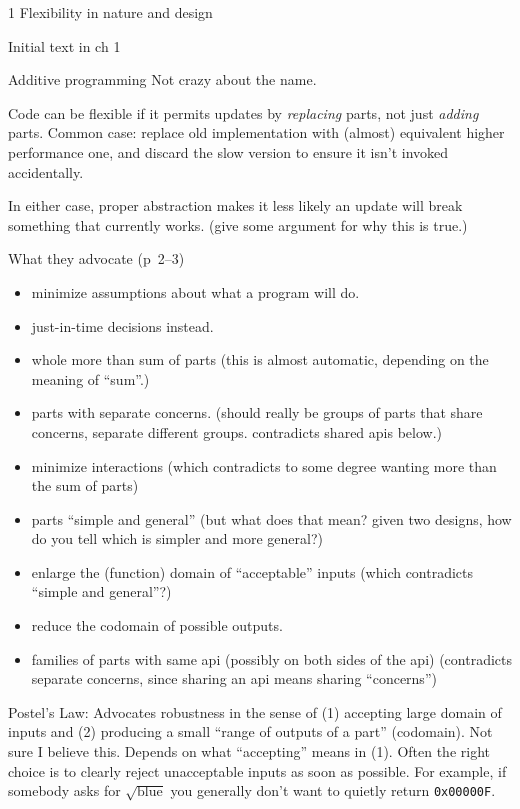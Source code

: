\documentclass[12pt]{PalisadesLakesBook}
\begin{document}
\begin{plSection}{1 Flexibility in nature and design}
\begin{plSection}{Initial text in ch 1}
\begin{plSection}{Additive programming}
Not crazy about the name.

Code can be flexible if it permits updates by \emph{replacing}
parts, not just \emph{adding} parts.
Common case: 
replace old implementation with (almost) equivalent 
higher performance one, and discard the slow version to ensure
it isn't invoked accidentally. 

In either case, proper abstraction makes it less likely
an update will break something that currently works.
(\TODO give some argument for why this is true.)

What they advocate (p~2--3)
\begin{itemize}
  \item minimize assumptions about what a program will do.
  \item just-in-time decisions instead.
  \item whole more than sum of parts (this is almost automatic,
  depending on the meaning of ``sum''.)
  \item parts with separate concerns. (should really be groups of
  parts that share concerns, separate different groups.
  contradicts shared apis below.)
  \item minimize interactions (which contradicts to some degree
  wanting more than the sum of parts)
  \item parts ``simple and general'' 
  (but what does that mean? given two designs, how do you
  tell which is simpler and more general?)
  \item enlarge the (function) domain of ``acceptable'' inputs
  (which contradicts ``simple and general''?)
  \item reduce the codomain of possible outputs. 
  \item families of parts with same api (possibly on both sides
  of the api) (contradicts separate concerns, since sharing
  an api means sharing ``concerns'')
\end{itemize}

Postel's Law: Advocates robustness in the sense of
(1) accepting large domain of inputs
and (2) producing a small ``range of outputs of a part'' 
(codomain).
Not sure I believe this.
Depends on what ``accepting'' means in (1).
Often the right choice is to clearly reject unacceptable inputs
as soon as possible.
For example, if somebody asks for $\sqrt{\text{blue}}$
you generally don't want to quietly return \texttt{0x00000F}.


\end{plSection}
\end{plSection}
\end{plSection}
\end{document}

